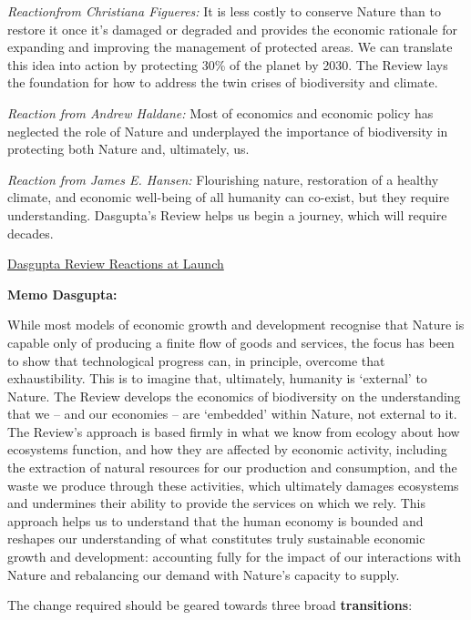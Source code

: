 \documentclass[
]{book}
\begin{document}
\emph{Reactionfrom Christiana Figueres:}
It is less costly to conserve Nature than to restore it once it's damaged or degraded and provides the economic rationale for expanding and improving the management of protected areas. We can translate this idea into action by protecting 30\% of the planet by 2030. The Review lays the foundation for how to address the twin crises of biodiversity and climate.

\emph{Reaction from Andrew Haldane:}
Most of economics and economic policy has neglected the role of Nature and
underplayed the importance of biodiversity in protecting both Nature and, ultimately, us.

\emph{Reaction from James E. Hansen:}
Flourishing nature, restoration of a healthy climate, and economic well-being of all humanity can co-exist, but they require understanding. Dasgupta's Review helps us begin a journey, which will require decades.

\href{https://www.gov.uk/government/publications/final-report-the-economics-of-biodiversity-the-dasgupta-review/the-economics-of-biodiversity-the-dasgupta-review-reactions}{Dasgupta Review Reactions at Launch}

\textbf{Memo Dasgupta:}

While most models of economic growth and development recognise that Nature is capable only
of producing a finite flow of goods and services, the focus has been to show that technological
progress can, in principle, overcome that exhaustibility. This is to imagine that, ultimately,
humanity is `external' to Nature.
The Review develops the economics of biodiversity on the understanding that we -- and our
economies -- are `embedded' within Nature, not external to it. The Review's approach is based
firmly in what we know from ecology about how ecosystems function, and how they are
affected by economic activity, including the extraction of natural resources for our production
and consumption, and the waste we produce through these activities, which ultimately damages
ecosystems and undermines their ability to provide the services on which we rely. This approach
helps us to understand that the human economy is bounded and reshapes our understanding
of what constitutes truly sustainable economic growth and development: accounting fully for
the impact of our interactions with Nature and rebalancing our demand with Nature's capacity
to supply.

The change required should be geared towards three broad \textbf{transitions}:
\end{document}
